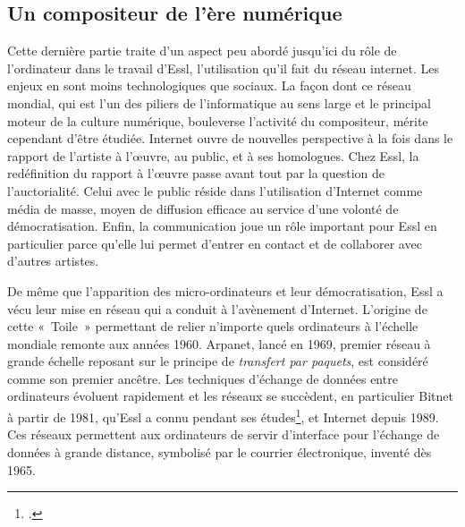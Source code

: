 \documentclass[a4paper,12pt]{article}
\newcommand{\guill}[1]{«~#1~»}
\begin{document}
\subsection{Un compositeur de l'ère numérique}

Cette dernière partie traite d'un aspect peu abordé jusqu'ici du rôle de l'ordinateur dans le travail d'Essl, l'utilisation qu'il fait du réseau internet. Les enjeux en sont moins technologiques que sociaux. La façon dont ce réseau mondial, qui est l'un des piliers de l'informatique au sens large et le principal moteur de la culture numérique, bouleverse l'activité du compositeur, mérite cependant d'être étudiée. Internet ouvre de nouvelles perspective à la fois dans le rapport de l'artiste à l'œuvre, au public, et à ses homologues. Chez Essl, la redéfinition du rapport à l'œuvre passe avant tout par la question de l'auctorialité. Celui avec le public réside dans l'utilisation d'Internet comme média de masse, moyen de diffusion efficace au service d'une volonté de démocratisation. Enfin, la communication joue un rôle important pour Essl en particulier parce qu'elle lui permet d'entrer en contact et de collaborer avec d'autres artistes.

De même que l'apparition des micro-ordinateurs et leur démocratisation, Essl a vécu leur mise en réseau qui a conduit à l'avènement d'Internet. L'origine de cette \guill{Toile} permettant de relier n'importe quels ordinateurs à l'échelle mondiale remonte aux années 1960. Arpanet, lancé en 1969, premier réseau à grande échelle reposant sur le principe de \emph{transfert par paquets}, est considéré comme son premier ancêtre. Les techniques d'échange de données entre ordinateurs évoluent rapidement et les réseaux se succèdent, en particulier Bitnet à partir de 1981, qu'Essl a connu pendant ses études\footnote{\cite{ehrler}.}, et Internet depuis 1989. Ces réseaux permettent aux ordinateurs de servir d'interface pour l'échange de données à grande distance, symbolisé par le courrier électronique, inventé dès 1965.
\end{document}

